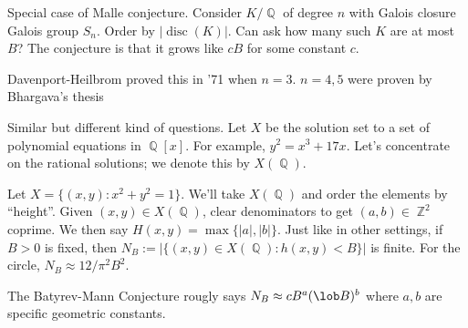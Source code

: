 \documentclass[11pt, a4paper]{memoir}
\DeclareMathOperator{\Q}{{\mathbb{Q}}}
\DeclareMathOperator{\Z}{{\mathbb{Z}}}
\theoremstyle{change}
\theoremstyle{plain}
\theoremstyle{nonumberplain}
\DeclareMathOperator{\disc}{disc}
\begin{document}
Special case of Malle conjecture.
Consider $K/\Q$ of degree $n$ with Galois closure Galois group $S_n$.
Order by $|\disc(K)|$.
Can ask how many such $K$ are at most $B$?
The conjecture is that it grows like $cB$ for some constant $c$.

Davenport-Heilbrom proved this in '71 when $n=3$.
$n=4,5$ were proven by Bhargava's thesis

Similar but different kind of questions.
Let $X$ be the solution set to a set of polynomial equations in $\Q[x]$.
For example, $y^2=x^3+17x$.
Let's concentrate on the rational solutions; we denote this by $X(\Q)$.

Let $X=\{(x,y):x^2+y^2=1\}$.
We'll take $X(\Q)$ and order the elements by ``height''.
Given $(x,y)\in X(\Q)$, clear denominators to get $(a,b)\in\Z^2$ coprime.
We then say $H(x,y)=\max\{|a|,|b|\}$.
Just like in other settings, if $B>0$ is fixed, then $N_B:=|\{(x,y)\in X(\Q):h(x,y)<B\}|$ is finite.
For the circle, $N_B\approx 12/\pi^2 B^2$.

The Batyrev-Mann Conjecture rougly says $N_B\approx cB^a(\lob B)^b$ where $a,b$ are specific geometric constants.
\end{document}
